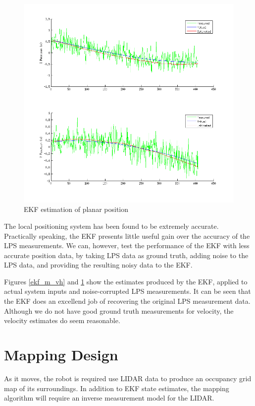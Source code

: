 \documentclass[11pt]{article} %
\begin{document}
\begin{figure} [hbt]
 \centering
 \includegraphics[scale=0.65]{ekf_meas_xy.png}
 \caption{EKF estimation of planar position}
 \label{ekf_m_xy}
\end{figure}

The local positioning system has been found to be extremely accurate.  Practically speaking, the EKF presents little useful gain over the accuracy of the LPS measurements.  We can, however, test the performance of the EKF with less accurate position data, by taking LPS data as ground truth, adding noise to the LPS data, and providing the resulting noisy data to the EKF.

Figures \ref{ekf_m_vh} and \ref{ekf_m_xy} show the estimates produced by the EKF, applied to actual system inputs and noise-corrupted LPS measurements.  It can be seen that the EKF does an excellend job of recovering the original LPS measurement data.  Although we do not have good ground truth measurements for velocity, the velocity estimates do seem reasonable.

\clearpage

\section{Mapping Design}
As it moves, the robot is required use LIDAR data to produce an occupancy grid map of its surroundings.  In addition to EKF state estimates, the mapping algorithm will require an inverse measurement model for the LIDAR.
\end{document}
